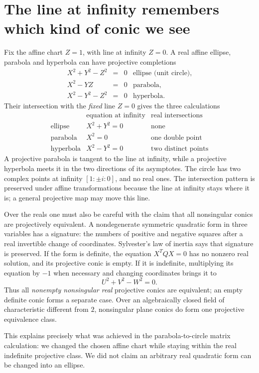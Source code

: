 \section{The line at infinity remembers which kind of conic we see}

Fix the affine chart $Z=1$, with line at infinity $Z=0$. A real affine ellipse, parabola and hyperbola can have projective completions
\[
 \begin{array}{rcll}
 X^2+Y^2-Z^2&=&0&\text{ellipse (unit circle)},\\
 X^2-YZ&=&0&\text{parabola},\\
 X^2-Y^2-Z^2&=&0&\text{hyperbola}.
 \end{array}
\]
Their intersection with the \emph{fixed} line $Z=0$ gives the three calculations
\[
 \begin{array}{c|c|c}
 &\text{equation at infinity}&\text{real intersections}\\\hline
 \text{ellipse}&X^2+Y^2=0&\text{none}\\
 \text{parabola}&X^2=0&\text{one double point}\\
 \text{hyperbola}&X^2-Y^2=0&\text{two distinct points}
 \end{array}
\]
A projective parabola is tangent to the line at infinity, while a projective hyperbola meets it in the two directions of its asymptotes. The circle has two complex points at infinity $[1:\pm i:0]$, and no real ones. The intersection pattern is preserved under affine transformations because the line at infinity stays where it is; a general projective map may move this line.

Over the reals one must also be careful with the claim that all nonsingular conics are projectively equivalent. A nondegenerate symmetric quadratic form in three variables has a signature: the numbers of positive and negative squares after a real invertible change of coordinates. Sylvester's law of inertia says that signature is preserved. If the form is definite, the equation $X^TQX=0$ has no nonzero real solution, and its projective conic is empty. If it is indefinite, multiplying its equation by $-1$ when necessary and changing coordinates brings it to
\[
 U^2+V^2-W^2=0.
\]
Thus all \emph{nonempty nonsingular real} projective conics are equivalent; an empty definite conic forms a separate case. Over an algebraically closed field of characteristic different from $2$, nonsingular plane conics do form one projective equivalence class.

This explains precisely what was achieved in the parabola-to-circle matrix calculation: we changed the chosen affine chart while staying within the real indefinite projective class. We did not claim an arbitrary real quadratic form can be changed into an ellipse.


